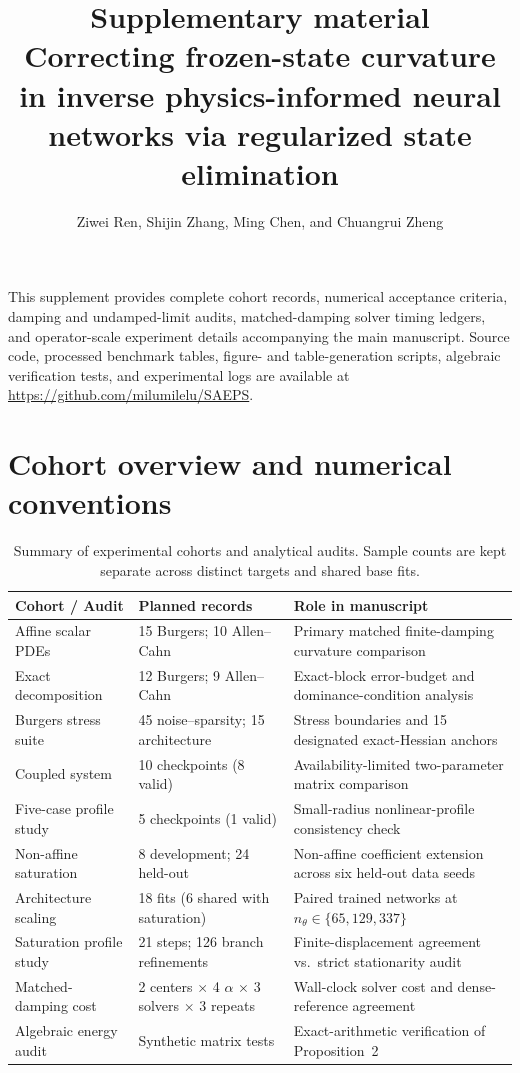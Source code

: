 \documentclass[10pt,letterpaper]{article}
\title{Supplementary material\\[4pt]\large Correcting frozen-state curvature in inverse physics-informed neural networks via regularized state elimination}
\author{Ziwei Ren, Shijin Zhang, Ming Chen, and Chuangrui Zheng}
\date{}
\begin{document}
\maketitle
\noindent This supplement provides complete cohort records, numerical acceptance criteria, damping and undamped-limit audits, matched-damping solver timing ledgers, and operator-scale experiment details accompanying the main manuscript.
Source code, processed benchmark tables, figure- and table-generation scripts, algebraic verification tests, and experimental logs are available at \url{https://github.com/milumilelu/SAEPS}.

\section{Cohort overview and numerical conventions}
\begin{table}[!htbp]
\centering\small
\caption{Summary of experimental cohorts and analytical audits. Sample counts are kept separate across distinct targets and shared base fits.}
\begin{tabular}{p{.23\linewidth}p{.26\linewidth}p{.43\linewidth}}
\toprule
Cohort / Audit & Planned records & Role in manuscript\\\midrule
Affine scalar PDEs & 15 Burgers; 10 Allen--Cahn & Primary matched finite-damping curvature comparison\\
Exact decomposition & 12 Burgers; 9 Allen--Cahn & Exact-block error-budget and dominance-condition analysis\\
Burgers stress suite & 45 noise--sparsity; 15 architecture & Stress boundaries and 15 designated exact-Hessian anchors\\
Coupled system & 10 checkpoints (8 valid) & Availability-limited two-parameter matrix comparison\\
Five-case profile study & 5 checkpoints (1 valid) & Small-radius nonlinear-profile consistency check\\
Non-affine saturation & 8 development; 24 held-out & Non-affine coefficient extension across six held-out data seeds\\
Architecture scaling & 18 fits (6 shared with saturation) & Paired trained networks at $n_\theta\in\{65,129,337\}$\\
Saturation profile study & 21 steps; 126 branch refinements & Finite-displacement agreement vs.\ strict stationarity audit\\
Matched-damping cost & 2 centers $\times$ 4 $\alpha$ $\times$ 3 solvers $\times$ 3 repeats & Wall-clock solver cost and dense-reference agreement\\
Algebraic energy audit & Synthetic matrix tests & Exact-arithmetic verification of Proposition~2\\
\bottomrule
\end{tabular}
\end{table}
\end{document}
